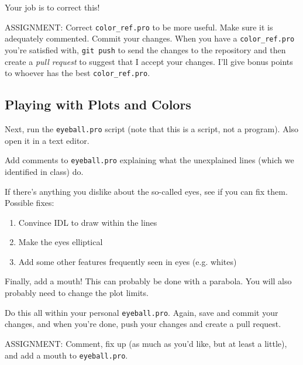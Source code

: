 \documentclass{article}
\begin{document}
\begin{spacing}{1.0}
Your job is to correct this!  

ASSIGNMENT: Correct \verb|color_ref.pro| to be more useful.  Make sure it is
adequately commented.  Commit your changes. When you have a
\verb|color_ref.pro| you're satisfied with, \verb|git push|  to send the
changes to the repository and then create a \emph{pull request} to suggest that
I accept your changes.  I'll give bonus points to whoever has the best
\verb|color_ref.pro|.

\subsection{Playing with Plots and Colors}
Next, run the \verb|eyeball.pro| script (note that this is a script, not
a program).  Also open it in a text editor.

Add comments to \verb|eyeball.pro| explaining what the unexplained lines (which
we identified in class) do.  

If there's anything you dislike about the so-called eyes, see if you can fix
them.  Possible fixes: 
\begin{enumerate}
    \item Convince IDL to draw within the lines 
    \item Make the eyes elliptical
    \item Add some other features frequently seen in eyes (e.g. whites)
\end{enumerate}

Finally, add a mouth!  This can probably be done with a parabola.  You
will also probably need to change the plot limits.  

Do this all within your personal \verb|eyeball.pro|.  Again, save and commit
your changes, and when you're done, push your changes and create a pull
request.

ASSIGNMENT: Comment, fix up (as much as you'd like, but at least a little),
and add a mouth to \verb|eyeball.pro|.

\end{spacing}
\end{document}
